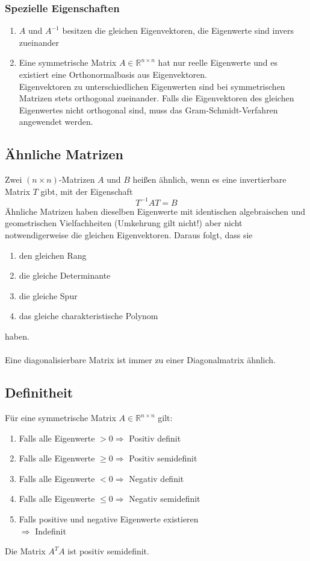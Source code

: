 \documentclass[a4paper,twocolumn,10pt]{article}
\begin{document}
\subsubsection{Spezielle Eigenschaften}
\begin{enumerate}[label= $\bullet$]
\item $A$ und $A^{-1}$ besitzen die gleichen Eigenvektoren, die Eigenwerte sind invers zueinander
\item Eine symmetrische Matrix $A\in\mathbb{R}^{n\times n}$ hat nur reelle Eigenwerte und es existiert eine Orthonormalbasis aus Eigenvektoren.\\
Eigenvektoren zu unterschiedlichen Eigenwerten sind bei symmetrischen Matrizen stets orthogonal zueinander. Falls die Eigenvektoren des gleichen Eigenwertes nicht orthogonal sind, muss das Gram-Schmidt-Verfahren angewendet werden.
\end{enumerate}

\subsection{Ähnliche Matrizen}
Zwei $(n\times n)$-Matrizen $A$ und $B$ heißen ähnlich, wenn es eine invertierbare Matrix $T$ gibt, mit der Eigenschaft
\begin{equation*}
T^{-1}AT=B
\end{equation*}
Ähnliche Matrizen haben dieselben Eigenwerte mit identischen algebraischen und geometrischen Vielfachheiten (Umkehrung gilt nicht!) aber nicht notwendigerweise die gleichen Eigenvektoren. Daraus folgt, dass sie
\begin{enumerate}
\item den gleichen Rang
\item die gleiche Determinante
\item die gleiche Spur
\item das gleiche charakteristische Polynom
\end{enumerate}
haben.\\\\
Eine diagonalisierbare Matrix ist immer zu einer Diagonalmatrix ähnlich.

\subsection{Definitheit}
Für eine symmetrische Matrix $A\in\mathbb{R}^{n\times n}$ gilt:
\begin{enumerate}[label=$\bullet$]
\item Falls alle Eigenwerte $>0\Rightarrow$ Positiv definit
\item Falls alle Eigenwerte $\geq 0\Rightarrow$ Positiv semidefinit
\item Falls alle Eigenwerte $<0\Rightarrow$ Negativ definit
\item Falls alle Eigenwerte $\leq 0\Rightarrow$ Negativ semidefinit
\item Falls positive und negative Eigenwerte existieren\\
$\Rightarrow$ Indefinit
\end{enumerate}
Die Matrix $A^TA$ ist positiv semidefinit.
\end{document}
